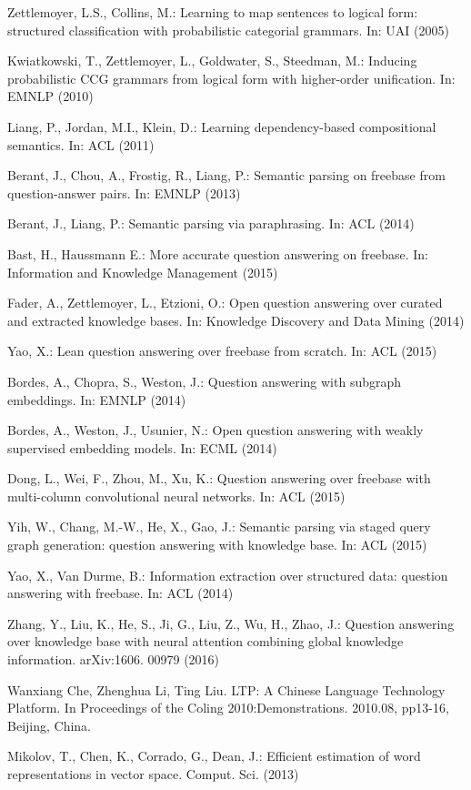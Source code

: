 \documentclass{llncs}
\begin{document}
%
%
\begin{thebibliography}{5}

Zettlemoyer, L.S., Collins, M.: Learning to map sentences to logical form: structured
classification with probabilistic categorial grammars. In: UAI (2005)

Kwiatkowski, T., Zettlemoyer, L., Goldwater, S., Steedman, M.: Inducing probabilistic CCG
grammars from logical form with higher-order unification. In: EMNLP (2010)

Liang, P., Jordan, M.I., Klein, D.: Learning dependency-based compositional semantics. In:
ACL (2011)

Berant, J., Chou, A., Frostig, R., Liang, P.: Semantic parsing on freebase from
question-answer pairs. In: EMNLP (2013)

Berant, J., Liang, P.: Semantic parsing via paraphrasing. In: ACL (2014)

Bast, H., Haussmann E.: More accurate question answering on freebase. In: Information and
Knowledge Management (2015)

Fader, A., Zettlemoyer, L., Etzioni, O.: Open question answering over curated and extracted
knowledge bases. In: Knowledge Discovery and Data Mining (2014)

Yao, X.: Lean question answering over freebase from scratch. In: ACL (2015)

Bordes, A., Chopra, S., Weston, J.: Question answering with subgraph embeddings. In:
EMNLP (2014)

Bordes, A., Weston, J., Usunier, N.: Open question answering with weakly supervised
embedding models. In: ECML (2014)

Dong, L., Wei, F., Zhou, M., Xu, K.: Question answering over freebase with multi-column
convolutional neural networks. In: ACL (2015)

Yih, W., Chang, M.-W., He, X., Gao, J.: Semantic parsing via staged query graph
generation: question answering with knowledge base. In: ACL (2015)

Yao, X., Van Durme, B.: Information extraction over structured data: question answering
with freebase. In: ACL (2014)

Zhang, Y., Liu, K., He, S., Ji, G., Liu, Z., Wu, H., Zhao, J.: Question answering over
knowledge base with neural attention combining global knowledge information. arXiv:1606.
00979 (2016)

Wanxiang Che, Zhenghua Li, Ting Liu. LTP: A Chinese Language Technology Platform. In Proceedings of the Coling 2010:Demonstrations. 2010.08, pp13-16, Beijing, China. 

Mikolov, T., Chen, K., Corrado, G., Dean, J.: Efficient estimation of word representations in
vector space. Comput. Sci. (2013)
\end{thebibliography}
\end{document}
